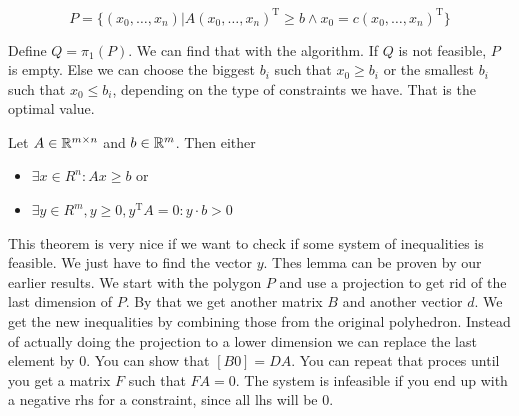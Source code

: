 \[P=\{(x_0,\ldots,x_n) | A(x_0,\ldots,x_n)^{\mbox{T}} \geq b \wedge x_0=c(x_0,\ldots,x_n)^{\mbox{T}}\}\]

Define $Q = \pi_1(P)$. We can  find that with the algorithm. If $Q$ is not feasible, $P$ is empty. Else we can choose the biggest $b_i$ such that $x_0\geq b_i$ or the smallest $b_i$ such that $x_0 \leq b_i$, depending on the type of constraints we have. That is the optimal value.

\begin{thm} Let $A\in \mathbb{R}^{m\times n}$ and $b\in \mathbb{R}^m$. Then either 
\begin{itemize}
\item $\exists x\in R^n: Ax\geq b$ or
\item $\exists y\in R^m, y\geq 0, y^{\mbox{T}}A=0: y\cdot b>0$
\end{itemize}
\end{thm}

This theorem is very nice if we want to check if some system of inequalities is feasible. We just have to find the vector $y$. Thes lemma can be proven by our earlier results. We start with the polygon $P$ and use a projection to get rid of the last dimension of $P$. By that we get another matrix $B$ and another vectior $d$. We get the new inequalities by combining those from the original polyhedron. Instead of actually doing the projection to a lower dimension we can replace the last element by 0. You can show that $[B0]=DA$. You can repeat that proces until you get a matrix $F$ such that $FA=0$. The system is infeasible if you end up with a negative rhs for a constraint, since all lhs will be 0.